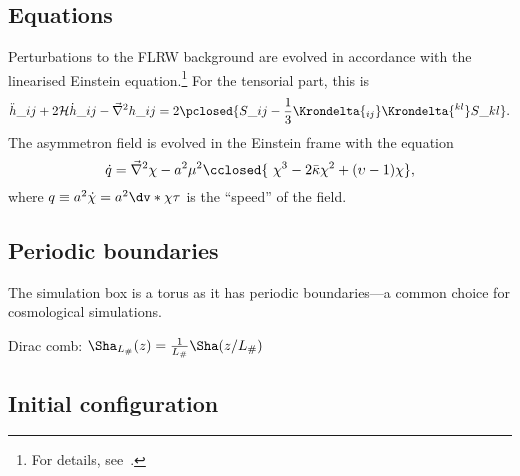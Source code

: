 \subsection{Equations}
    Perturbations to the FLRW background are evolved in accordance with the linearised Einstein equation.\footnote{For details, see~\citet{adamekGevolutionCosmologicalNbody2016}.} For the tensorial part, this is %
    \begin{equation}
        \ddot{h}\_{ij} + 2\mathcal{H} \dot{h}\_{ij} - \vec{\nabla}^2 h\_{ij} = 2\pclosed{S\_{ij}-\frac{1}{3}\Krondelta{_{ij}} \Krondelta{^{kl}}S\_{kl} }.%
    \end{equation}
    The asymmetron field is evolved in the Einstein frame with the equation
    \begin{equation}
        \dot{q} = \vec{\nabla}^2 \chi - a^2 \mu^2 \cclosed{ \chi^3 - 2\bar{\kappa} \chi^2 + (\upsilon-1) \chi},
    \end{equation}
    where $q\equiv a^2 \dot{\chi}=a^2 \dv*{\chi}{\tau}$ is the ``speed'' of the field. 







\subsection{Periodic boundaries}
    The simulation box is a torus as it has periodic boundaries---a common choice for cosmological simulations. 

    \begin{bullets}
        \item Dirac comb: $\Sha_{L_\#}(z) = \frac{1}{L_{\#}}  \Sha (z/L_\#)$
    \end{bullets}



\subsection{Initial configuration}

